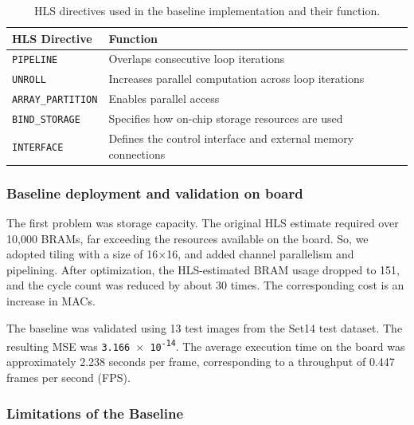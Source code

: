\begin{table}[!htbp]
\centering
\footnotesize
\caption{HLS directives used in the baseline implementation and their function.}
\label{tab:1}
\begin{tabularx}{\linewidth}{lY}
\toprule
HLS Directive & Function \\
\midrule
\texttt{PIPELINE} & Overlaps consecutive loop iterations \\
\texttt{UNROLL} & Increases parallel computation across loop iterations \\
\texttt{ARRAY\_PARTITION} & Enables parallel access \\
\texttt{BIND\_STORAGE} & Specifies how on-chip storage resources are used \\
\texttt{INTERFACE} & Defines the control interface and external memory connections \\
\bottomrule
\end{tabularx}
\end{table}

\subsubsection{Baseline deployment and validation on board}\label{sec:2.1.1}

The first problem was storage capacity. The original HLS estimate required over 10,000 BRAMs, far exceeding the resources available on the board. So, we adopted tiling with a size of 16$\times$16, and added channel parallelism and pipelining. After optimization, the HLS-estimated BRAM usage dropped to 151, and the cycle count was reduced by about 30 times. The corresponding cost is an increase in MACs.

The baseline was validated using 13 test images from the Set14 test dataset. The resulting MSE was \texttt{3.166 $\times$ 10\textsuperscript{-14}}. The average execution time on the board was approximately 2.238 seconds per frame, corresponding to a throughput of 0.447 frames per second (FPS).

\subsubsection{Limitations of the Baseline}\label{sec:2.1.2}

